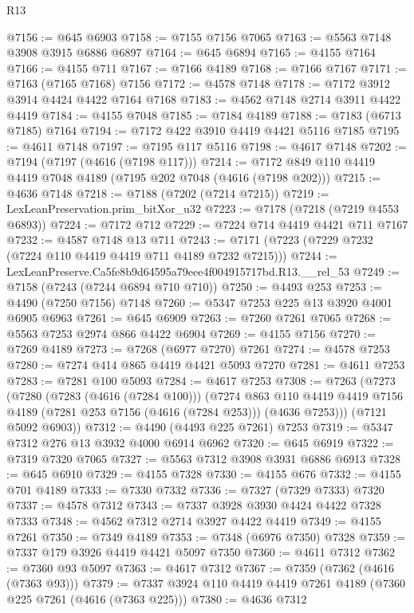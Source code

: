 \begin{lexlean}{R13}
\begin{coremodule}
@7156 := @645 @6903
@7158 := @7155 @7156 @7065
@7163 := @5563 @7148 @3908 @3915 @6886 @6897
@7164 := @645 @6894
@7165 := @4155 @7164
@7166 := @4155 @711
@7167 := @7166 @4189
@7168 := @7166 @7167
@7171 := @7163 (@7165 @7168) @7156
@7172 := @4578 @7148
@7178 := @7172 @3912 @3914 @4424 @4422 @7164 @7168
@7183 := @4562 @7148 @2714 @3911 @4422 @4419
@7184 := @4155 @7048
@7185 := @7184 @4189
@7188 := @7183 (@6713 @7185) @7164
@7194 := @7172 @422 @3910 @4419 @4421 @5116 @7185
@7195 := @4611 @7148
@7197 := @7195 @117 @5116
@7198 := @4617 @7148
@7202 := @7194 (@7197 (@4616 (@7198 @117)))
@7214 := @7172 @849 @110 @4419 @4419 @7048 @4189 (@7195 @202 @7048 (@4616 (@7198 @202)))
@7215 := @4636 @7148
@7218 := @7188 (@7202 (@7214 @7215))
@7219 := LexLeanPreservation.prim_bitXor_u32
@7223 := @7178 (@7218 (@7219 @4553 @6893))
@7224 := @7172 @712
@7229 := @7224 @714 @4419 @4421 @711 @7167
@7232 := @4587 @7148 @13 @711
@7243 := @7171 (@7223 (@7229 @7232 (@7224 @110 @4419 @4419 @711 @4189 @7232 @7215)))
@7244 := LexLeanPreserve.Ca5fe8b9d64595a79eee4f004915717bd.R13.__rel_53
@7249 := @7158 (@7243 (@7244 @6894 @710 @710))
@7250 := @4493 @253
@7253 := @4490 (@7250 @7156) @7148
@7260 := @5347 @7253 @225 @13 @3920 @4001 @6905 @6963
@7261 := @645 @6909
@7263 := @7260 @7261 @7065
@7268 := @5563 @7253 @2974 @866 @4422 @6904
@7269 := @4155 @7156
@7270 := @7269 @4189
@7273 := @7268 (@6977 @7270) @7261
@7274 := @4578 @7253
@7280 := @7274 @414 @865 @4419 @4421 @5093 @7270
@7281 := @4611 @7253
@7283 := @7281 @100 @5093
@7284 := @4617 @7253
@7308 := @7263
    (@7273
      (@7280
        (@7283 (@4616 (@7284 @100)))
        (@7274
          @863
          @110
          @4419
          @4419
          @7156
          @4189
          (@7281 @253 @7156 (@4616 (@7284 @253)))
          (@4636 @7253)))
      (@7121 @5092 @6903))
@7312 := @4490 (@4493 @225 @7261) @7253
@7319 := @5347 @7312 @276 @13 @3932 @4000 @6914 @6962
@7320 := @645 @6919
@7322 := @7319 @7320 @7065
@7327 := @5563 @7312 @3908 @3931 @6886 @6913
@7328 := @645 @6910
@7329 := @4155 @7328
@7330 := @4155 @676
@7332 := @4155 @701 @4189
@7333 := @7330 @7332
@7336 := @7327 (@7329 @7333) @7320
@7337 := @4578 @7312
@7343 := @7337 @3928 @3930 @4424 @4422 @7328 @7333
@7348 := @4562 @7312 @2714 @3927 @4422 @4419
@7349 := @4155 @7261
@7350 := @7349 @4189
@7353 := @7348 (@6976 @7350) @7328
@7359 := @7337 @179 @3926 @4419 @4421 @5097 @7350
@7360 := @4611 @7312
@7362 := @7360 @93 @5097
@7363 := @4617 @7312
@7367 := @7359 (@7362 (@4616 (@7363 @93)))
@7379 := @7337 @3924 @110 @4419 @4419 @7261 @4189 (@7360 @225 @7261 (@4616 (@7363 @225)))
@7380 := @4636 @7312

\end{coremodule}
\end{lexlean}
